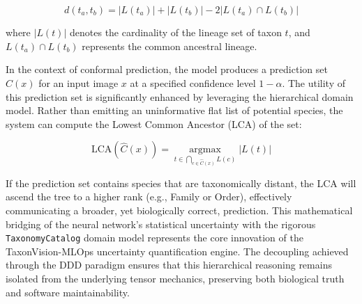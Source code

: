 \begin{equation}
d(t_a, t_b) = |L(t_a)| + |L(t_b)| - 2 |L(t_a) \cap L(t_b)|
\end{equation}

where $|L(t)|$ denotes the cardinality of the lineage set of taxon $t$, and $L(t_a) \cap L(t_b)$ represents the common ancestral lineage.

In the context of conformal prediction, the model produces a prediction set $\hat{C}(x)$ for an input image $x$ at a specified confidence level $1 - \alpha$. The utility of this prediction set is significantly enhanced by leveraging the hierarchical domain model. Rather than emitting an uninformative flat list of potential species, the system can compute the Lowest Common Ancestor (LCA) of the set:

\begin{equation}
\text{LCA}(\hat{C}(x)) = \operatorname*{argmax}_{t \in \bigcap_{c \in \hat{C}(x)} L(c)} |L(t)|
\end{equation}

If the prediction set contains species that are taxonomically distant, the LCA will ascend the tree to a higher rank (e.g., Family or Order), effectively communicating a broader, yet biologically correct, prediction. This mathematical bridging of the neural network's statistical uncertainty with the rigorous \texttt{TaxonomyCatalog} domain model represents the core innovation of the TaxonVision-MLOps uncertainty quantification engine. The decoupling achieved through the DDD paradigm ensures that this hierarchical reasoning remains isolated from the underlying tensor mechanics, preserving both biological truth and software maintainability.
